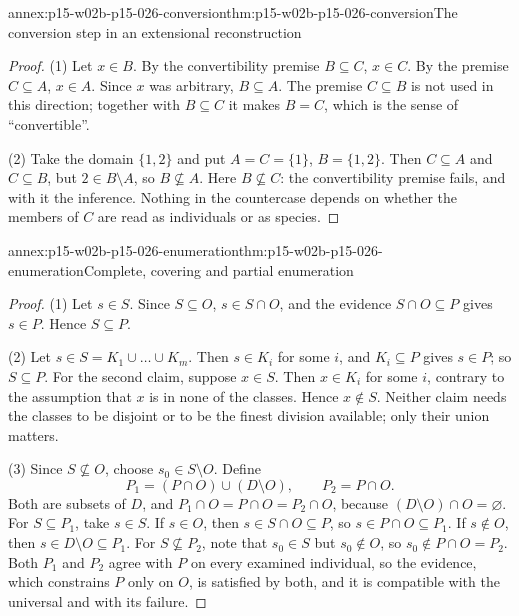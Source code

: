 \begin{annexitem}{annex:p15-w02b-p15-026-conversion}{thm:p15-w02b-p15-026-conversion}{The conversion step in an extensional reconstruction}
\begin{proof}
(1) Let $x\in B$. By the convertibility premise $B\subseteq C$, $x\in C$.
By the premise $C\subseteq A$, $x\in A$. Since $x$ was arbitrary,
$B\subseteq A$. The premise $C\subseteq B$ is not used in this direction;
together with $B\subseteq C$ it makes $B=C$, which is the sense of
``convertible''.

(2) Take the domain $\{1,2\}$ and put $A=C=\{1\}$, $B=\{1,2\}$. Then
$C\subseteq A$ and $C\subseteq B$, but $2\in B\setminus A$, so
$B\not\subseteq A$. Here $B\not\subseteq C$: the convertibility premise
fails, and with it the inference. Nothing in the countercase depends on
whether the members of $C$ are read as individuals or as species.
\end{proof}
\end{annexitem}

\begin{annexitem}{annex:p15-w02b-p15-026-enumeration}{thm:p15-w02b-p15-026-enumeration}{Complete, covering and partial enumeration}
\begin{proof}
(1) Let $s\in S$. Since $S\subseteq O$, $s\in S\cap O$, and the evidence
$S\cap O\subseteq P$ gives $s\in P$. Hence $S\subseteq P$.

(2) Let $s\in S=K_1\cup\dots\cup K_m$. Then $s\in K_i$ for some $i$, and
$K_i\subseteq P$ gives $s\in P$; so $S\subseteq P$. For the second claim,
suppose $x\in S$. Then $x\in K_i$ for some $i$, contrary to the assumption
that $x$ is in none of the classes. Hence $x\notin S$. Neither claim needs
the classes to be disjoint or to be the finest division available; only
their union matters.

(3) Since $S\not\subseteq O$, choose $s_0\in S\setminus O$. Define
\[
P_1=(P\cap O)\cup(D\setminus O),\qquad P_2=P\cap O .
\]
Both are subsets of $D$, and $P_1\cap O=P\cap O=P_2\cap O$, because
$(D\setminus O)\cap O=\varnothing$. For $S\subseteq P_1$, take $s\in S$.
If $s\in O$, then $s\in S\cap O\subseteq P$, so $s\in P\cap O\subseteq
P_1$. If $s\notin O$, then $s\in D\setminus O\subseteq P_1$. For
$S\not\subseteq P_2$, note that $s_0\in S$ but $s_0\notin O$, so
$s_0\notin P\cap O=P_2$. Both $P_1$ and $P_2$ agree with $P$ on every
examined individual, so the evidence, which constrains $P$ only on $O$, is
satisfied by both, and it is compatible with the universal and with its
failure.
\end{proof}
\end{annexitem}

